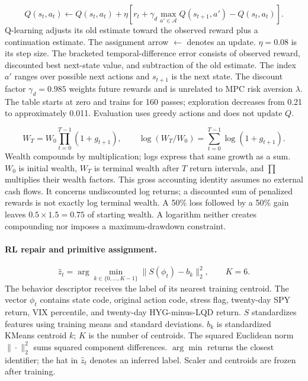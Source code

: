 \begin{equation}
Q(s_t,a_t)\leftarrow Q(s_t,a_t)+
\eta\left[r_t+\gamma_d\max_{a'\in\mathcal A}Q(s_{t+1},a')-Q(s_t,a_t)\right].
\label{eq:q-update-detailed}
\end{equation}
Q-learning adjusts its old estimate toward the observed reward plus a continuation estimate.
The assignment arrow $\leftarrow$ denotes an update. $\eta=0.08$ is its step size. The bracketed temporal-difference error consists of observed reward, discounted best next-state value, and subtraction of the old estimate. The index $a'$ ranges over possible next actions and $s_{t+1}$ is the next state. The discount factor $\gamma_d=0.985$ weights future rewards and is unrelated to MPC risk aversion $\lambda$. The table starts at zero and trains for 160 passes; exploration decreases from 0.21 to approximately 0.011. Evaluation uses greedy actions and does not update $Q$.

\begin{equation}
W_T=W_0\prod_{t=0}^{T-1}(1+g_{t+1}),\qquad
\log(W_T/W_0)=\sum_{t=0}^{T-1}\log(1+g_{t+1}).
\label{eq:compounding}
\end{equation}
Wealth compounds by multiplication; logs express that same growth as a sum.
$W_0$ is initial wealth, $W_T$ is terminal wealth after $T$ return intervals, and $\prod$ multiplies their wealth factors. This gross accounting identity assumes no external cash flows. It concerns undiscounted log returns; a discounted sum of penalized rewards is not exactly log terminal wealth. A 50\% loss followed by a 50\% gain leaves $0.5\times1.5=0.75$ of starting wealth. A logarithm neither creates compounding nor imposes a maximum-drawdown constraint.

\paragraph{RL repair and primitive assignment.}
\begin{equation}
\hat z_t=\arg\min_{k\in\{0,\ldots,K-1\}}\|S(\phi_t)-b_k\|_2^2,\qquad K=6.
\label{eq:primitive-detailed}
\end{equation}
The behavior descriptor receives the label of its nearest training centroid.
The vector $\phi_t$ contains state code, original action code, stress flag, twenty-day SPY return, VIX percentile, and twenty-day HYG-minus-LQD return. $S$ standardizes features using training means and standard deviations. $b_k$ is standardized KMeans centroid $k$; $K$ is the number of centroids. The squared Euclidean norm $\|\cdot\|_2^2$ sums squared component differences. $\arg\min$ returns the closest identifier; the hat in $\hat z_t$ denotes an inferred label. Scaler and centroids are frozen after training.

